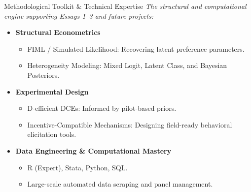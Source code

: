 \begin{frame}{Methodological Toolkit \& Technical Expertise}
    \centering \textit{\small The structural and computational engine supporting Essays 1--3 and future projects:}
    \vspace{0.3cm}
    \begin{itemize}
        \item \textbf{Structural Econometrics}
            \begin{itemize}
                \item \alert{FIML / Simulated Likelihood}: Recovering latent preference parameters.
                \item \alert{Heterogeneity Modeling}: Mixed Logit, Latent Class, and Bayesian Posteriors.
            \end{itemize}
        \item \textbf{Experimental Design}
            \begin{itemize}
                \item \alert{D-efficient DCEs}: Informed by pilot-based priors.
                \item \alert{Incentive-Compatible Mechanisms}: Designing field-ready behavioral elicitation tools.
            \end{itemize}
        \item \textbf{Data Engineering \& Computational Mastery}
            \begin{itemize}
                \item \alert{R (Expert)}, Stata, Python, SQL.
                \item Large-scale automated data scraping and panel management.
            \end{itemize}
    \end{itemize}
\end{frame}
